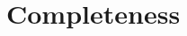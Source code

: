 \documentclass[main.tex]{subfiles}
\begin{document}
\section{Completeness}
\clearpage
\end{document}
